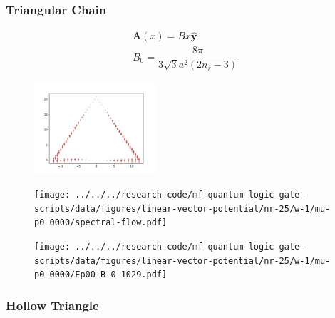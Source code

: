 \documentclass[xcolor=dvipsnames,10pt,aspectratio=169]{beamer}
\let\oldhat\hat
\renewcommand{\hat}[1]{\oldhat{\mathbf{#1}}}
\renewcommand{\vec}[1]{\mathbf{#1}}
\begin{document}
  \begin{frame}
    \frametitle{Triangular Chain}

    \begin{multicols}{2}
    \vspace{-2em}
    \small
    \begin{gather*}
      \vec{A}(x) = B x \hat{y} \\
      B_0 = \dfrac{8 \pi}{3\sqrt{3} a^2 (2 n_r - 3)}
    \end{gather*}

    \vspace{-4em}
    \begin{figure}
      \includegraphics[width=0.4\textwidth]{./figures/vector-potential-field.pdf}
    \end{figure}

    \begin{figure}
      \center
      \hspace{-1.25em}
      \texttt{[image: ../../../research-code/mf-quantum-logic-gate-scripts/data/figures/linear-vector-potential/nr-25/w-1/mu-p0\_0000/spectral-flow.pdf]}
    \end{figure}

    \vspace{-1em}

    \begin{figure}
      \texttt{[image: ../../../research-code/mf-quantum-logic-gate-scripts/data/figures/linear-vector-potential/nr-25/w-1/mu-p0\_0000/Ep00-B-0\_1029.pdf]}
    \end{figure}
    \end{multicols}

  \end{frame}

  \begin{frame}
    \frametitle{Hollow Triangle}

    \begin{figure}
    \end{figure}
  \end{frame}
\end{document}

